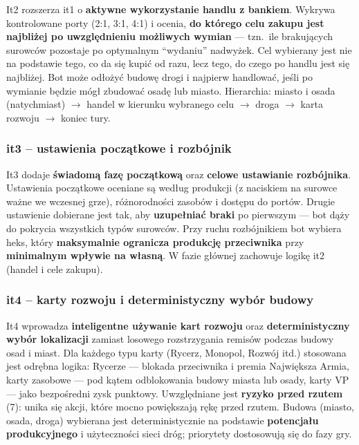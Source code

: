 \documentclass[polish,inz,longabstract]{iithesis}
\begin{document}
It2 rozszerza it1 o \textbf{aktywne wykorzystanie handlu z bankiem}. Wykrywa kontrolowane porty (2:1, 3:1, 4:1) i ocenia, \textbf{do którego celu zakupu jest najbliżej po uwzględnieniu możliwych wymian} --- tzn.\ ile brakujących surowców pozostaje po optymalnym ``wydaniu'' nadwyżek. Cel wybierany jest nie na podstawie tego, co da się kupić od razu, lecz tego, do czego po handlu jest się najbliżej. Bot może odłożyć budowę drogi i najpierw handlować, jeśli po wymianie będzie mógł zbudować osadę lub miasto. Hierarchia: miasto i osada (natychmiast) $\rightarrow$ handel w kierunku wybranego celu $\rightarrow$ droga $\rightarrow$ karta rozwoju $\rightarrow$ koniec tury.

\subsubsection{it3 -- ustawienia początkowe i rozbójnik}

It3 dodaje \textbf{świadomą fazę początkową} oraz \textbf{celowe ustawianie rozbójnika}. Ustawienia początkowe oceniane są według produkcji (z naciskiem na surowce ważne we wczesnej grze), różnorodności zasobów i dostępu do portów. Drugie ustawienie dobierane jest tak, aby \textbf{uzupełniać braki} po pierwszym --- bot dąży do pokrycia wszystkich typów surowców. Przy ruchu rozbójnikiem bot wybiera heks, który \textbf{maksymalnie ogranicza produkcję przeciwnika} przy \textbf{minimalnym wpływie na własną}. W fazie głównej zachowuje logikę it2 (handel i cele zakupu).

\subsubsection{it4 -- karty rozwoju i deterministyczny wybór budowy}

It4 wprowadza \textbf{inteligentne używanie kart rozwoju} oraz \textbf{deterministyczny wybór lokalizacji} zamiast losowego rozstrzygania remisów podczas budowy osad i miast. Dla każdego typu karty (Rycerz, Monopol, Rozwój itd.) stosowana jest odrębna logika: Rycerze --- blokada przeciwnika i premia Największa Armia, karty zasobowe --- pod kątem odblokowania budowy miasta lub osady, karty VP --- jako bezpośredni zysk punktowy. Uwzględniane jest \textbf{ryzyko przed rzutem} (7): unika się akcji, które mocno powiększają rękę przed rzutem. Budowa (miasto, osada, droga) wybierana jest deterministycznie na podstawie \textbf{potencjału produkcyjnego} i użyteczności sieci dróg; priorytety dostosowują się do fazy gry.
\end{document}
